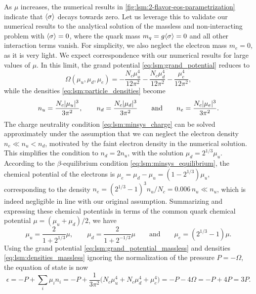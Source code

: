 As $\mu$ increases, the numerical results in \cref{fig:lsm:2-flavor-eos-parametrization} indicate that $\langle \sigma \rangle$ decays towards zero.
Let us leverage this to validate our numerical results to the analytical solution of the massless and non-interacting problem with $\langle \sigma \rangle = 0$,
where the quark mass $m_q = g \langle \sigma \rangle = 0$ and all other interaction terms vanish.
For simplicity, we also neglect the electron mass $m_e = 0$, as it is very light.
We expect correspondence with our numerical results for large values of $\mu$.
In this limit, the grand potential \eqref{eq:lsm:grand_potential} reduces to
\begin{equation}
	\Omega(\mu_u, \mu_d, \mu_e) = -\frac{N_c \mu_u^4}{12 \pi^2} - \frac{N_c \mu_d^4}{12 \pi^2} - \frac{\mu_e^4}{12 \pi^2},
\label{eq:lsm:grand_potential_massless}
\end{equation}
while the densities \eqref{eq:lsm:particle_densities} become
\begin{equation}
	n_u = \frac{N_c \lvert \mu_u \rvert^3}{3 \pi^2}, \qquad
	n_d = \frac{N_c \lvert \mu_d \rvert^3}{3 \pi^2}  \qquad \text{and} \qquad
	n_e = \frac{N_c \lvert \mu_e \rvert^3}{3 \pi^2}.
\label{eq:lsm:densities_massless}
\end{equation}
The charge neutrality condition \eqref{eq:lsm:minsys_charge} can be solved approximately under the assumption that we can neglect the electron density $n_e \ll n_u < n_d$,
motivated by the faint electron density in the numerical solution.
This simplifies the condition to $n_d = 2 n_u$, with the solution $\mu_d = 2^{1/3} \mu_u$.
According to the $\beta$-equilibrium condition \eqref{eq:lsm:minsys_equilibrium},
the chemical potential of the electrons is $\mu_e = \mu_d - \mu_u = (1-2^{1/3}) \mu_u$,
corresponding to the density $n_e = (2^{1/3}-1)^3 n_u / N_c = 0.006 \, n_u \ll n_u$,
which is indeed negligible in line with our original assumption.
Summarizing and expressing these chemical potentials in terms of the common quark chemical potential $\mu = (\mu_u+\mu_d)/2$, we have
\begin{equation}
	\mu_u = \frac{2}{1+2^{1/3}} \mu, \qquad
	\mu_d = \frac{2}{1+2^{-1/3}} \mu \qquad \text{and} \qquad
	\mu_e = (2^{1/3}-1) \mu.
\label{eq:lsm:chemical_potentials_massless}
\end{equation}
Using the grand potential \eqref{eq:lsm:grand_potential_massless} and densities \eqref{eq:lsm:densities_massless} ignoring the normalization of the pressure $P = -\Omega$, the equation of state is now
\begin{equation}
	\epsilon = -P + \sum_i \mu_i n_i = -P + \frac{1}{3 \pi^2} \Big(N_c \mu_u^4 + N_c \mu_d^4 + \mu_e^4\Big) = -P - 4 \Omega = -P + 4 P = 3 P .
\end{equation}
